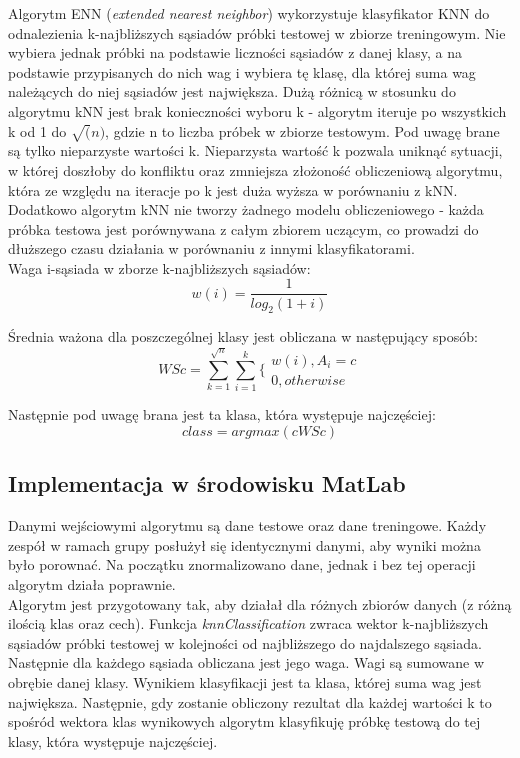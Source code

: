\documentclass[[10pt,a4paper]{article}
\begin{document}
Algorytm ENN (\emph{extended nearest neighbor}) wykorzystuje klasyfikator KNN do odnalezienia k-najbliższych sąsiadów próbki testowej w zbiorze treningowym. Nie wybiera jednak próbki na podstawie liczności sąsiadów z danej klasy, a na podstawie przypisanych do nich wag i wybiera tę klasę, dla której suma wag należących do niej sąsiadów jest największa. Dużą różnicą w stosunku do algorytmu kNN jest brak konieczności wyboru k - algorytm iteruje po wszystkich k od 1 do \(\sqrt(n)\), gdzie n to liczba próbek w zbiorze testowym. Pod uwagę brane są tylko nieparzyste wartości k. Nieparzysta wartość k pozwala uniknąć sytuacji, w której doszłoby do konfliktu oraz zmniejsza złożoność obliczeniową algorytmu, która ze względu na iteracje po k jest duża wyższa w porównaniu z kNN. Dodatkowo algorytm kNN nie tworzy żadnego modelu obliczeniowego - każda próbka testowa jest porównywana z całym zbiorem uczącym, co prowadzi do dłuższego czasu działania w porównaniu z innymi klasyfikatorami. ~\cite{enn} ~\cite{enn2}\\

Waga i-sąsiada w zborze k-najbliższych sąsiadów:
\[w(i) = \frac{1}{log_2(1+i)}\]

Średnia ważona dla poszczególnej klasy jest obliczana w następujący sposób:
\[WSc = \sum_{k=1}^{\sqrt{n}} \sum^{k}_{i=1} \left. \{\begin{array} {l} w(i), A_{i} = c \\ 0, otherwise  \end{array} \right .\]

Następnie pod uwagę brana jest ta klasa, która występuje najczęściej:
\[ class = argmax(c WSc)\]

\subsection{Implementacja w środowisku MatLab}
Danymi wejściowymi algorytmu są dane testowe oraz dane treningowe. Każdy zespół w ramach grupy posłużył się identycznymi danymi, aby wyniki można było porownać. Na początku znormalizowano dane, jednak i bez tej operacji algorytm działa poprawnie.\\

Algorytm jest przygotowany tak, aby działał dla różnych zbiorów danych (z różną ilością klas oraz cech). Funkcja \emph{knnClassification} zwraca wektor k-najbliższych sąsiadów próbki testowej w kolejności od najbliższego do najdalszego sąsiada. Następnie dla każdego sąsiada obliczana jest jego waga. Wagi są sumowane w obrębie danej klasy. Wynikiem klasyfikacji jest ta klasa, której suma wag jest największa. Następnie, gdy zostanie obliczony rezultat dla każdej wartości k to spośród wektora klas wynikowych algorytm klasyfikuję próbkę testową do tej klasy, która występuje najczęściej.
\end{document}
